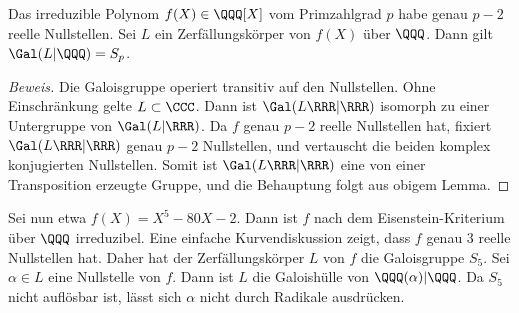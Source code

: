 \documentclass[12pt,a4paper,twoside]{article}
\begin{document}
\begin{Lemma}
  Das irreduzible Polynom $f(X)\in\QQQ[X]$ vom Primzahlgrad $p$ habe genau
  $p-2$ reelle Nullstellen. Sei $L$ ein Zerf\"allungsk\"orper von $f(X)$
  \"uber $\QQQ$. Dann gilt $\Gal(L|\QQQ)=S_p$.
\end{Lemma}
\begin{proof}[Beweis]
  Die Galoisgruppe operiert transitiv auf den Nullstellen. Ohne
  Einschr\"ankung gelte $L\subset\CCC$. Dann ist $\Gal(L\RRR|\RRR)$ isomorph
  zu einer Untergruppe von $\Gal(L|\RRR)$. Da $f$ genau $p-2$ reelle
  Nullstellen hat, fixiert $\Gal(L\RRR|\RRR)$ genau $p-2$ Nullstellen, und
  vertauscht die beiden komplex konjugierten Nullstellen. Somit ist
  $\Gal(L\RRR|\RRR)$ eine von einer Transposition erzeugte Gruppe, und die
  Behauptung folgt aus obigem Lemma.
\end{proof}
Sei nun etwa $f(X)=X^5-80X-2$. Dann ist $f$ nach dem Eisenstein-Kriterium
\"uber $\QQQ$ irreduzibel. Eine einfache Kurvendiskussion zeigt, dass $f$
genau $3$ reelle Nullstellen hat. Daher hat der Zerf\"allungsk\"orper $L$ von
$f$ die Galoisgruppe $S_5$. Sei $\alpha\in L$ eine Nullstelle von $f$. Dann
ist $L$ die Galoish\"ulle von $\QQQ(\alpha)|\QQQ$. Da $S_5$ nicht aufl\"osbar
ist, l\"asst sich $\alpha$ nicht durch Radikale ausdr\"ucken.
\end{document}

